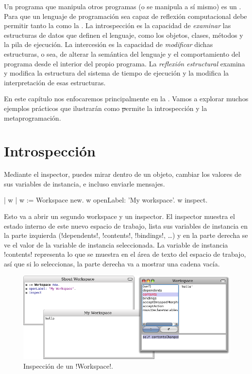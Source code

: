 \documentclass[a4paper,10pt,twoside]{book}
\begin{document}
Un programa que manipula otros programas (o se manipula a sí mismo) es
un .  Para que un lenguaje de programación sea
capaz de reflexión computacional debe permitir tanto la
 como la .  La introspección es la
capacidad de \emph{examinar} las estructuras de datos que definen el
lenguaje, como los objetos, clases, métodos y la pila de ejecución.
La intercesión es la capacidad de \emph{modificar} dichas estructuras,
o sea, de alterar la semántica del lenguaje y el comportamiento del
programa desde el interior del propio programa.  La \emph{reflexión
  estructural} examina y modifica la estructura del sistema de tiempo
de ejecución y la  modifica la
interpretación de esas estructuras.

En este capítulo nos enfocaremos principalmente en la . Vamos a explorar muchos ejemplos prácticos que
ilustrarán como \st permite la introspección y la metaprogramación.

\section{Introspección}

Mediante el inspector, puedes mirar dentro de un objeto, cambiar los
valores de sus variables de instancia, e incluso enviarle mensajes.

\begin{code}{| w |}
w := Workspace new.
w openLabel: 'My workspace'.
w inspect.
\end{code}

Esto va a abrir un segundo workspace y un inspector.  El inspector
muestra el estado interno de este nuevo espacio de trabajo, lista sus
variables de instancia en la parte izquierda (\ct!dependents!,
\ct!contents!, \ct!bindings!, \ldots) y en la parte derecha se ve el
valor de la variable de instancia seleccionada.  La variable de
instancia \ct!contents! representa lo que se muestra en el área de
texto del espacio de trabajo, así que si lo seleccionas, la parte
derecha va a mostrar una cadena vacía.

\begin{figure}[ht]\centering
        \includegraphics[width=\linewidth]{workspaceInspector}
        \caption{Inspección de un \ct!Workspace!.}
\end{figure}
\end{document}
